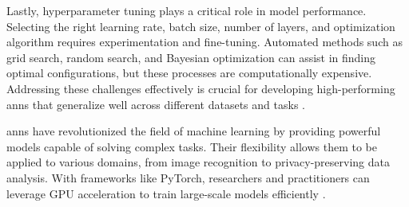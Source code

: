 Lastly, hyperparameter tuning plays a critical role in model performance.
Selecting the right learning rate, batch size, number of layers, and optimization algorithm requires experimentation and fine-tuning.
Automated methods such as grid search, random search, and Bayesian optimization can assist in finding optimal configurations, but these processes are computationally expensive.
Addressing these challenges effectively is crucial for developing high-performing \ac{ann}s that generalize well across different datasets and tasks \cite{pytorchPyTorch}.

\ac{ann}s have revolutionized the field of machine learning by providing powerful models capable of solving complex tasks.
Their flexibility allows them to be applied to various domains, from image recognition to privacy-preserving data analysis.
With frameworks like PyTorch, researchers and practitioners can leverage GPU acceleration to train large-scale models efficiently \cite{pytorchPyTorch}.

